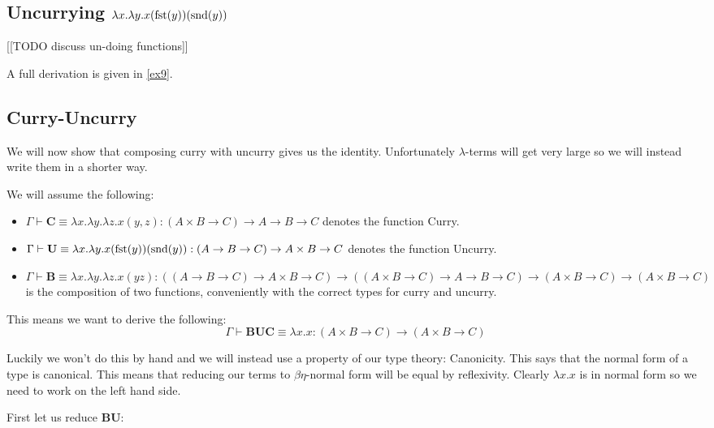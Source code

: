 \begin{example}
\subsection{Uncurrying $\lambda x . \lambda y . x (\mathrm{fst}(y))(\mathrm{snd}(y))$} %
[[TODO discuss un-doing functions]]

A full derivation is given in \ref{ex9}.

\subsection{Curry-Uncurry}

We will now show that composing curry with uncurry gives us the identity. Unfortunately $\lambda$-terms will get very large so we will instead write them in a shorter way.
\begin{example}\label{curry_uncurry}
    We will assume the following:
    \begin{itemize}
    \item $\Gamma \vdash \mathbf{C} \equiv \lambda x . \lambda y . \lambda z . x (y, z) : (A \times B \to C) \to A \to B \to C$ denotes the function Curry.    
    \item $\Gamma \vdash \mathbf{U} \equiv \lambda x . \lambda y . x (\mathrm{fst}(y))(\mathrm{snd}(y)) : (A \to B \to C) \to A \times B \to C$ denotes the function Uncurry.
    \item $\Gamma \vdash \mathbf{B} \equiv \lambda x . \lambda y . \lambda z . x ( y z) : ((A \to B \to C) \to A \times B \to C) \to ((A \times B \to C) \to A \to B \to C) \to (A \times B \to C) \to (A \times B \to C)$ is the composition of two functions, conveniently with the correct types for curry and uncurry.
    \end{itemize}

    This means we want to derive the following:
    $$
        \Gamma \vdash \mathbf{B} \mathbf{U} \mathbf{C} \equiv \lambda x . x : (A \times B \to C) \to (A \times B \to C)
    $$
    
    Luckily we won't do this by hand and we will instead use a property of our type theory: Canonicity. This says that the normal form of a type is canonical. This means that reducing our terms to $\beta \eta$-normal form will be equal by reflexivity. Clearly $\lambda x . x$ is in normal form so we need to work on the left hand side.
    
    First let us reduce $\mathbf{B} \mathbf{U}$:
    

\end{example}
\end{example}
